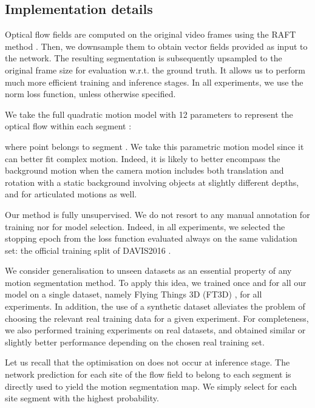 \documentclass[10pt,twocolumn,letterpaper]{article}
\begin{document}
\subsection{Implementation details}
\label{implementationdetails}

Optical flow fields are computed on the original video frames using the RAFT method \cite{teed_raft_2020}. Then, we downsample them to obtain  vector fields provided as input to the network. The resulting segmentation is subsequently upsampled to the original frame size for evaluation w.r.t. the ground truth. It allows us to perform much more efficient training and inference stages. In all experiments, we use the  norm loss function, unless otherwise specified.

We take the full quadratic motion model with 12 parameters to represent the optical flow within each segment :

where point  belongs to segment . We take this parametric motion model since it can better fit complex motion. {\color{black} Indeed, it is likely to better encompass} the background motion when the camera motion includes both translation and rotation with a static {\color{black} background involving objects at slightly} different depths, and for articulated motions as well.

Our method is fully unsupervised. We do not resort to any manual annotation for training nor for model selection. Indeed, in all experiments, we selected the stopping epoch from the loss function evaluated always on the same validation set: the official training split of DAVIS2016 \cite{pont-tuset_benchmark_2016}. 


We consider generalisation to unseen datasets as an essential property of any motion segmentation method. To apply this idea, we trained once and for all our model on a single dataset, namely Flying Things 3D (FT3D) \cite{ft3d2016}, for all experiments.
In addition, the use of a synthetic dataset alleviates the problem of choosing the relevant real training data for a given experiment. For completeness, we also performed training experiments on real datasets, and obtained similar or slightly better performance depending on the chosen real training set.


Let us recall that the optimisation on  does not occur at inference stage. The network prediction for each site of the flow field to belong to each segment  is directly used to yield the motion segmentation map. We simply select for each site segment  with the highest probability. 
\end{document}
